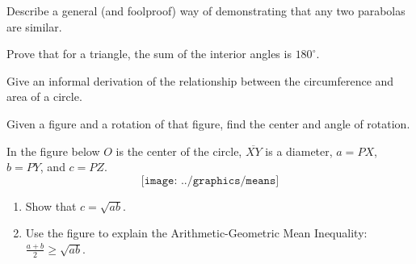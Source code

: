 \begin{prob}
Describe a general (and foolproof) way of demonstrating that any two parabolas are similar.
\end{prob}

\begin{prob}
Prove that for a triangle, the sum of the interior angles is $180^\circ$.
\end{prob}

%
%
\begin{prob}
Give an informal derivation of the relationship between the circumference and area of a circle. 
\end{prob}

\begin{prob}
Given a figure and a rotation of that figure, find the center and angle of rotation.  
\end{prob}
\newpage 

\begin{prob}
In the figure below  $O$ is the center of the circle, $\overline{XY}$ is a diameter, $a = PX$, $b=PY$, and $c=PZ$.  
$$\texttt{[image: ../graphics/means]}$$
\begin{enumerate}
\item Show that $c=\sqrt{ab}$.  
\item Use the figure to explain the Arithmetic-Geometric Mean Inequality: $\frac{a+b}{2} \ge \sqrt{ab}$.  
\end{enumerate}
\end{prob}


